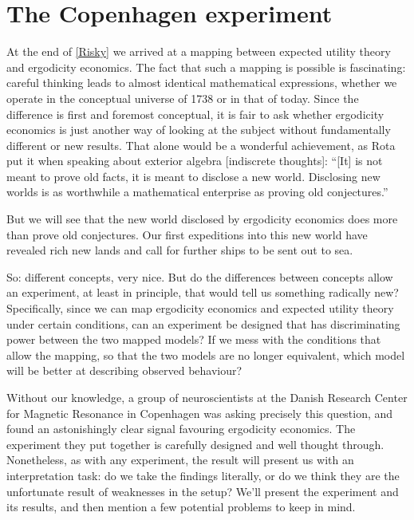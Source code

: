 \section{The Copenhagen experiment}
At the end of \cref{Risky} we arrived at a mapping between expected utility 
theory and ergodicity economics. The fact that such a mapping is possible is fascinating: careful 
thinking leads to almost identical mathematical expressions, whether we operate in the conceptual
universe of 1738 or in that of today. Since the difference is first and foremost conceptual, 
it is fair to ask whether ergodicity economics is just another way of looking at the subject
without fundamentally different or new results. That alone would be a wonderful achievement,
as Rota put it when speaking about exterior algebra \cite[p.48]{Rota1997} [indiscrete thoughts]: 
``[It] is not meant to prove old facts, it is meant to disclose a new world. Disclosing new 
worlds is as worthwhile a mathematical enterprise as proving old conjectures.''

But we will see that the new world disclosed by ergodicity economics does more than 
prove old conjectures. Our first expeditions into this new world have revealed rich 
new lands and call for further ships to be sent out to sea.

So: different concepts, very nice. But do the differences between concepts allow an experiment, 
at least in principle, that would tell us something radically new? Specifically, since we can 
map ergodicity economics and expected utility theory under certain conditions, can an experiment
be designed that has discriminating power between the two mapped models? If we mess with the
conditions that allow the mapping, so that the two models are no longer equivalent, which model
will be better at describing observed behaviour?

Without our knowledge, a group of neuroscientists at the Danish Research Center for Magnetic 
Resonance in Copenhagen was asking precisely this question, and found an astonishingly clear
signal favouring ergodicity economics. The experiment they put together is
carefully designed and well thought through. Nonetheless, as with any experiment, the result will 
present us with an interpretation task: do we take the findings literally, or do we think they are 
the unfortunate result of weaknesses in the setup? We'll present the experiment and its results, 
and then mention a few potential problems to keep in mind.

